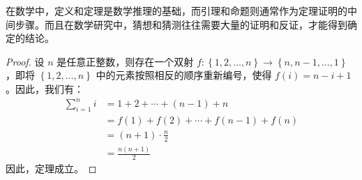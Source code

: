 \begin{rem}
  在数学中，定义和定理是数学推理的基础，而引理和命题则通常作为定理证明的中间步骤。而且在数学研究中，猜想和猜测往往需要大量的证明和反证，才能得到确定的结论。
\end{rem}

\begin{proof}
  设 $n$ 是任意正整数，则存在一个双射 $f: \left\{1,2,\dots,n\right\} \rightarrow \left\{n,n-1,\dots,1\right\}$，即将 $\left\{1,2,\dots,n\right\}$ 中的元素按照相反的顺序重新编号，使得 $f(i) = n-i+1$。因此，我们有：
  \begin{align*}
    \sum_{i=1}^n i & = 1 + 2 + \cdots + (n-1) + n \\           
                   & = f(1) + f(2) + \cdots + f(n-1) + f(n) \\ 
                   & = (n+1) \cdot \frac{n}{2} \\              
                   & = \frac{n(n+1)}{2}                       
  \end{align*}
  因此，定理成立。
\end{proof}
